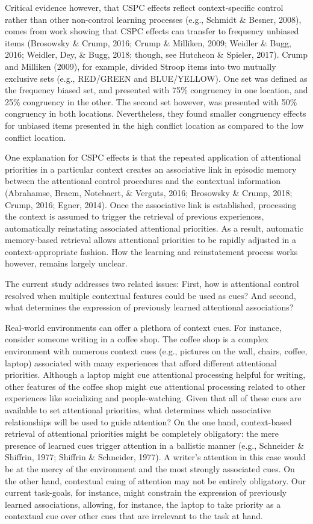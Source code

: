 \documentclass[english,,man,floatsintext]{apa6}
\begin{document}
Critical evidence however, that CSPC effects reflect context-specific control rather than other non-control learning processes (e.g., Schmidt \& Besner, 2008), comes from work showing that CSPC effects can transfer to frequency unbiased items (Brosowsky \& Crump, 2016; Crump \& Milliken, 2009; Weidler \& Bugg, 2016; Weidler, Dey, \& Bugg, 2018; though, see Hutcheon \& Spieler, 2017). Crump and Milliken (2009), for example, divided Stroop items into two mutually exclusive sets (e.g., RED/GREEN and BLUE/YELLOW). One set was defined as the frequency biased set, and presented with 75\% congruency in one location, and 25\% congruency in the other. The second set however, was presented with 50\% congruency in both locations. Nevertheless, they found smaller congruency effects for unbiased items presented in the high conflict location as compared to the low conflict location.

One explanation for CSPC effects is that the repeated application of attentional priorities in a particular context creates an associative link in episodic memory between the attentional control procedures and the contextual information (Abrahamse, Braem, Notebaert, \& Verguts, 2016; Brosowsky \& Crump, 2018; Crump, 2016; Egner, 2014). Once the associative link is established, processing the context is assumed to trigger the retrieval of previous experiences, automatically reinstating associated attentional priorities. As a result, automatic memory-based retrieval allows attentional priorities to be rapidly adjusted in a context-appropriate fashion. How the learning and reinstatement process works however, remains largely unclear.

The current study addresses two related issues: First, how is attentional control resolved when multiple contextual features could be used as cues? And second, what determines the expression of previously learned attentional associations?

Real-world environments can offer a plethora of context cues. For instance, consider someone writing in a coffee shop. The coffee shop is a complex environment with numerous context cues (e.g., pictures on the wall, chairs, coffee, laptop) associated with many experiences that afford different attentional priorities. Although a laptop might cue attentional processing helpful for writing, other features of the coffee shop might cue attentional processing related to other experiences like socializing and people-watching. Given that all of these cues are available to set attentional priorities, what determines which associative relationships will be used to guide attention? On the one hand, context-based retrieval of attentional priorities might be completely obligatory: the mere presence of learned cues trigger attention in a ballistic manner (e.g., Schneider \& Shiffrin, 1977; Shiffrin \& Schneider, 1977). A writer's attention in this case would be at the mercy of the environment and the most strongly associated cues. On the other hand, contextual cuing of attention may not be entirely obligatory. Our current task-goals, for instance, might constrain the expression of previously learned associations, allowing, for instance, the laptop to take priority as a contextual cue over other cues that are irrelevant to the task at hand.
\end{document}
